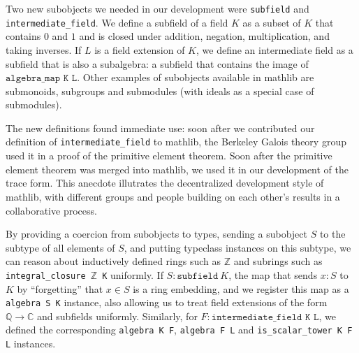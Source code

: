 \documentclass[a4paper,USenglish,cleveref, autoref, thm-restate]{lipics-v2021}
\newcommand{\C}{\mathbb{C}}
\newcommand{\lean}[1]{\texttt{#1}\xspace} %
\newcommand{\mathlib}{\textsf{mathlib}\xspace}
\newcommand{\Q}{\mathbb{Q}}
\newcommand{\Z}{\mathbb{Z}}
\begin{document}
Two new subobjects we needed in our development were \lean{subfield} and \lean{intermediate\-\_field}.
We define a subfield of a field $K$ as a subset of $K$ that contains $0$ and $1$ and is closed under addition, negation, multiplication, and taking inverses.
If $L$ is a field extension of $K$, we define an intermediate field as a subfield that is also a subalgebra: a subfield that contains the image of $\lean{algebra\_map K L}$.
Other examples of subobjects available in mathlib are submonoids, subgroups and submodules (with ideals as a special case of submodules).

The new definitions found immediate use:
soon after we contributed our definition of \lean{intermediate\_field} to \mathlib,
the Berkeley Galois theory group used it in a proof of the primitive element theorem.
Soon after the primitive element theorem was merged into \mathlib,
we used it in our development of the trace form.
This anecdote illutrates the decentralized development style of \mathlib,
with different groups and people building on each other's results in a collaborative process.

By providing a coercion from subobjects to types, sending a subobject $S$ to the subtype of all elements of $S$,
and putting typeclass instances on this subtype,
we can reason about inductively defined rings such as $\Z$ and subrings such as \lean{integral\_closure $\Z$ K} uniformly.
If $S : \lean{subfield}\ K$, the map that sends $x : S$ to $K$ by ``forgetting'' that $x \in S$ is a ring embedding,
and we register this map as a \lean{algebra S K} instance, also allowing us to treat field extensions of the form $\Q \to \C$ and subfields uniformly.
Similarly, for $F : \lean{intermediate\_field K L}$, we defined the corresponding \lean{algebra K F}, \lean{algebra F L} and \lean{is\_scalar\_tower K F L} instances.
\end{document}
